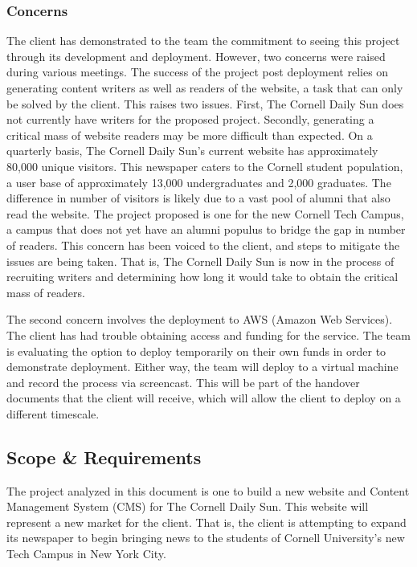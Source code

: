 \documentclass[11pt]{article} %
\begin{document}
\subsubsection{Concerns}

The client has demonstrated to the team the commitment to seeing this project through its development and deployment. However, two concerns were raised during various meetings. The success of the project post deployment relies on generating content writers as well as readers of the website, a task that can only be solved by the client. This raises two issues. First, The Cornell Daily Sun does not currently have writers for the proposed project. Secondly, generating a critical mass of website readers may be more difficult than expected. On a quarterly basis, The Cornell Daily Sun’s current website has approximately 80,000 unique visitors. This newspaper caters to the Cornell student population, a user base of approximately 13,000 undergraduates and 2,000 graduates. The difference in number of visitors is likely due to a vast pool of alumni that also read the website. The project proposed is one for the new Cornell Tech Campus, a campus that does not yet have an alumni populus to bridge the gap in number of readers. This concern has been voiced to the client, and steps to mitigate the issues are being taken. That is, The Cornell Daily Sun is now in the process of recruiting writers and determining how long it would take to obtain the critical mass of readers.

The second concern involves the deployment to AWS (Amazon Web Services). The client has had trouble obtaining access and funding for the service. The team is evaluating the option to deploy temporarily on their own funds in order to demonstrate deployment. Either way, the team will deploy to a virtual machine and record the process via screencast. This will be part of the handover documents that the client will receive, which will allow the client to deploy on a different timescale.

\subsection{Scope \& Requirements}

The project analyzed in this document is one to build a new website and Content Management System (CMS) for The Cornell Daily Sun. This website will represent a new market for the client. That is, the client is attempting to expand its newspaper to begin bringing news to the students of Cornell University’s new Tech Campus in New York City.
                   
\end{document}
